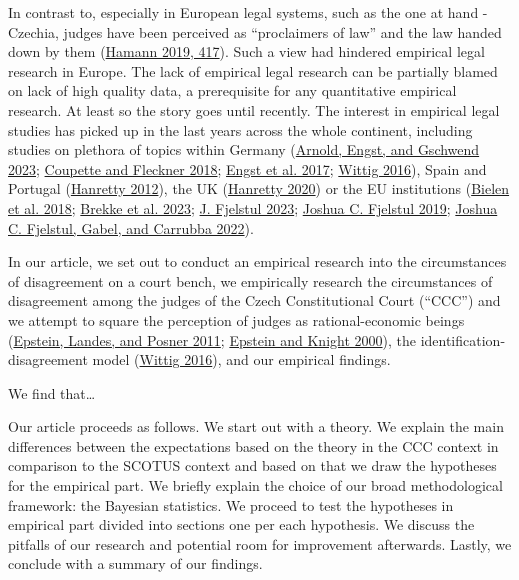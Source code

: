 \documentclass[
  11pt,
]{article}
\begin{document}
In contrast to, especially in European legal systems, such as the one at
hand - Czechia, judges have been perceived as ``proclaimers of law'' and
the law handed down by them
(\protect\hyperlink{ref-hamannGermanFederalCourts2019}{Hamann 2019,
417}). Such a view had hindered empirical legal research in Europe. The
lack of empirical legal research can be partially blamed on lack of high
quality data, a prerequisite for any quantitative empirical research. At
least so the story goes until recently. The interest in empirical legal
studies has picked up in the last years across the whole continent,
including studies on plethora of topics within Germany
(\protect\hyperlink{ref-arnoldScalingCourtDecisions2023}{Arnold, Engst,
and Gschwend 2023};
\protect\hyperlink{ref-coupetteQuantitativeRechtswissenschaft2018}{Coupette
and Fleckner 2018};
\protect\hyperlink{ref-engstEinflussParteinaheAuf2017}{Engst et al.
2017};
\protect\hyperlink{ref-wittigOccurrenceSeparateOpinions2016}{Wittig
2016}), Spain and Portugal
(\protect\hyperlink{ref-hanrettyDissentIberiaIdeal2012}{Hanretty 2012}),
the UK
(\protect\hyperlink{ref-hanrettyCourtSpecialistsJudicial2020}{Hanretty
2020}) or the EU institutions
(\protect\hyperlink{ref-bielenBacklogsLitigationRates2018}{Bielen et al.
2018}; \protect\hyperlink{ref-brekkeThatOrderHow2023}{Brekke et al.
2023}; \protect\hyperlink{ref-fjelstulHowChamberSystem2023}{J. Fjelstul
2023}; \protect\hyperlink{ref-fjelstulEvolutionEuropeanUnion2019}{Joshua
C. Fjelstul 2019};
\protect\hyperlink{ref-fjelstulTimelyAdministrationJustice2022}{Joshua
C. Fjelstul, Gabel, and Carrubba 2022}).

In our article, we set out to conduct an empirical research into the
circumstances of disagreement on a court bench, we empirically research
the circumstances of disagreement among the judges of the Czech
Constitutional Court (``CCC'') and we attempt to square the perception
of judges as rational-economic beings
(\protect\hyperlink{ref-epsteinWhyWhenJudges2011}{Epstein, Landes, and
Posner 2011};
\protect\hyperlink{ref-epsteinStrategicRevolutionJudicial2000}{Epstein
and Knight 2000}), the identification-disagreement model
(\protect\hyperlink{ref-wittigOccurrenceSeparateOpinions2016}{Wittig
2016}), and our empirical findings.

We find that\ldots{}

Our article proceeds as follows. We start out with a theory. We explain
the main differences between the expectations based on the theory in the
CCC context in comparison to the SCOTUS context and based on that we
draw the hypotheses for the empirical part. We briefly explain the
choice of our broad methodological framework: the Bayesian statistics.
We proceed to test the hypotheses in empirical part divided into
sections one per each hypothesis. We discuss the pitfalls of our
research and potential room for improvement afterwards. Lastly, we
conclude with a summary of our findings.
\end{document}
